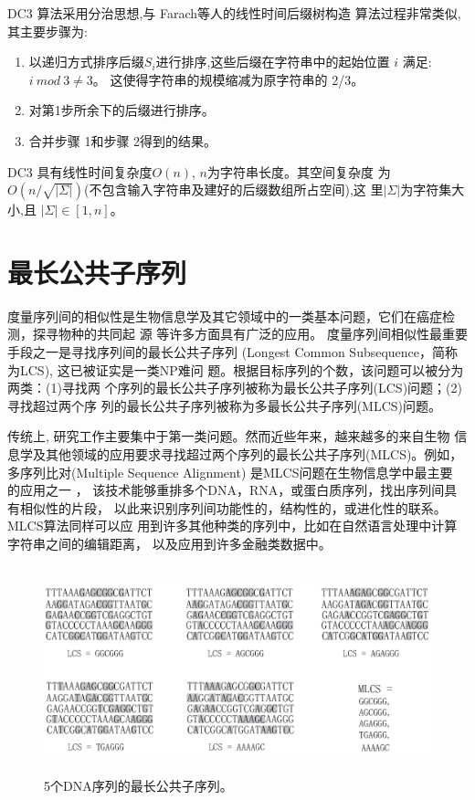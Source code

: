 DC3 算法采用分治思想,与 Farach\cite{Farach1997}等人的线性时间后缀树构造
算法过程非常类似,其主要步骤为:

\begin{enumerate}
\item 以递归方式排序后缀$S_i$进行排序,这些后缀在字符串中的起始位置 $i$
  满足: $i~ mod~ 3 \neq 3$。 这使得字符串的规模缩减为原字符串的 2/3。
\item 对第1步所余下的后缀进行排序。
\item 合并步骤 1和步骤 2得到的结果。
\end{enumerate}

DC3 具有线性时间复杂度$O(n)$, $n$为字符串长度。其空间复杂度
为 $O(n/\sqrt{|\Sigma|})$(不包含输入字符串及建好的后缀数组所占空间),这
里$|\Sigma|$为字符集大小,且 $|\Sigma| \in [1, n]$。


\section{最长公共子序列}

度量序列间的相似性是生物信息学及其它领域中的一类基本问题，它们在癌症检
测\cite{Aravanis2017,Chattopadhyay2016,Munday2017}，探寻物种的共同起
源 \cite{Zvelebil2007,Perry2015,Donnell2015} 等许多方面具有广泛的应用。
度量序列间相似性最重要手段之一是寻找序列间的最长公共子序列 (Longest
Common Subsequence，简称为LCS), 这已被证实是一类NP难问
题\cite{Maier1978}。根据目标序列的个数，该问题可以被分为两类：(1)寻找两
个序列的最长公共子序列被称为最长公共子序列(LCS)问题；(2) 寻找超过两个序
列的最长公共子序列被称为多最长公共子序列(MLCS)问题。

传统上, 研究工作主要集中于第一类问题。然而近些年来，越来越多的来自生物
信息学及其他领域的应用要求寻找超过两个序列的最长公共子序列(MLCS)。例如，
多序列比对(Multiple Sequence Alignment) 是MLCS问题在生物信息学中最主要
的应用之一 \cite{Katoh2016,Zou2015,Mirarab2015,Bawono2017,Chatzou2015}，
该技术能够重排多个DNA，RNA，或蛋白质序列，找出序列间具有相似性的片段，
以此来识别序列间功能性的，结构性的，或进化性的联系。 MLCS算法同样可以应
用到许多其他种类的序列中，比如在自然语言处理中计算字符串之间的编辑距离，
以及应用到许多金融类数据中。

\begin{figure}[H]
  \centering
  \includegraphics[height=6cm ,width=15cm]{figures/1_Introduction/MLCS.eps}
  \caption{5个DNA序列的最长公共子序列。}
  \label{fig:MLCS}
\end{figure}


